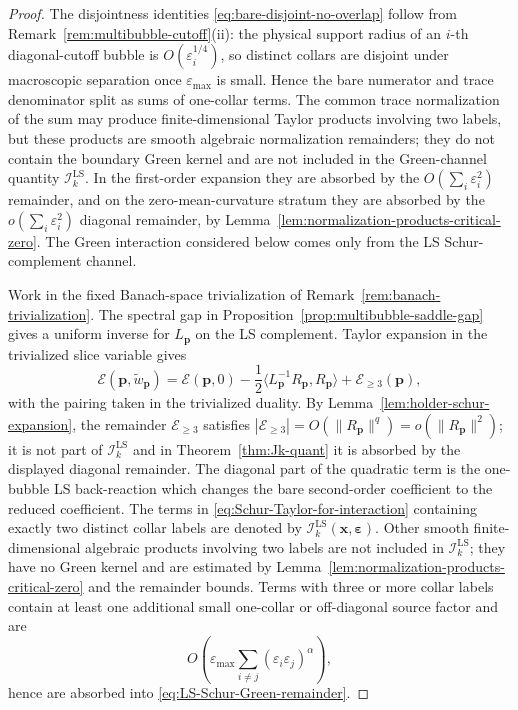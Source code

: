 \documentclass[11pt,reqno,a4paper]{amsart}
\numberwithin{equation}{section}
\theoremstyle{plain}
\theoremstyle{remark}
\theoremstyle{plain}
\begin{document}
\begin{proof}
The disjointness identities \eqref{eq:bare-disjoint-no-overlap} follow from
Remark~\ref{rem:multibubble-cutoff}\textup{(ii)}: the physical support radius of
an $i$-th diagonal-cutoff bubble is $O(\varepsilon_i^{1/4})$, so distinct collars
are disjoint under macroscopic separation once $\varepsilon_{\max}$ is small.
Hence the bare numerator and trace denominator split as sums of one-collar
terms.  The common trace normalization of the sum may produce finite-dimensional
Taylor products involving two labels, but these products are smooth algebraic
normalization remainders; they do not contain the boundary Green kernel and are not
included in the Green-channel quantity $\mathscr I_k^{\mathrm{LS}}$.  In the
first-order expansion they are absorbed by the $O(\sum_i\varepsilon_i^2)$
remainder, and on the zero-mean-curvature stratum they are absorbed by the
$o(\sum_i\varepsilon_i^2)$ diagonal remainder, by
Lemma~\ref{lem:normalization-products-critical-zero}.  The Green interaction
considered below comes only from the LS Schur-complement channel.

Work in the fixed Banach-space trivialization of
Remark~\ref{rem:banach-trivialization}.  The spectral gap in
Proposition~\ref{prop:multibubble-saddle-gap} gives a
uniform inverse for $L_{\mathbf p}$ on the LS complement.  Taylor expansion in
the trivialized slice variable gives
\begin{equation}\label{eq:Schur-Taylor-for-interaction}
\mathscr E(\mathbf p,\widetilde w_{\mathbf p})
=
\mathscr E(\mathbf p,0)
-\frac12\big\langle L_{\mathbf p}^{-1}R_{\mathbf p},R_{\mathbf p}\big\rangle
+
\mathscr E_{\ge3}(\mathbf p),
\end{equation}
with the pairing taken in the trivialized duality.  By
Lemma~\ref{lem:holder-schur-expansion}, the remainder
$\mathscr E_{\ge3}$ satisfies
$|\mathscr E_{\ge3}|=O(\|R_{\mathbf p}\|^q)=o(\|R_{\mathbf p}\|^2)$;
it is not part of $\mathscr I_k^{\mathrm{LS}}$ and in Theorem~\ref{thm:Jk-quant} it is
absorbed by the displayed diagonal remainder.  The diagonal part of the quadratic
term is the one-bubble LS back-reaction which changes the bare second-order
coefficient to the reduced coefficient.  The terms in
\eqref{eq:Schur-Taylor-for-interaction} containing exactly two distinct collar
labels are denoted by $\mathscr I_k^{\mathrm{LS}}(\mathbf x,\boldsymbol\varepsilon)$.
Other smooth finite-dimensional algebraic products involving two labels are not
included in $\mathscr I_k^{\mathrm{LS}}$; they have no Green kernel and are
estimated by Lemma~\ref{lem:normalization-products-critical-zero} and the
remainder bounds.  Terms with three or more collar labels contain at least one
additional small one-collar or off-diagonal source factor and are
\[
O\left(\varepsilon_{\max}
\sum_{i\ne j}(\varepsilon_i\varepsilon_j)^\alpha\right),
\]
hence are absorbed into \eqref{eq:LS-Schur-Green-remainder}.


\end{proof}
\end{document}
